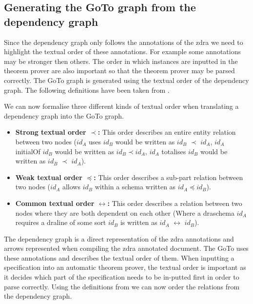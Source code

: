 \subsection{Generating the GoTo graph from the dependency graph}

Since the dependency graph only follows the annotations of the \gls{zdra} we
need to highlight the textual order of these annotations. For example some
annotations may be stronger then others. The order in which instances are
inputted in the theorem prover are also important so that the theorem prover may
be parsed correctly. The GoTo graph is generated using the textual order of the
dependency graph. The following definitions have been taken from
\cite{zengfirstyear}.

\begin{defin} We can now formalise three different kinds of
textual order when translating a dependency graph into the GoTo graph.

\begin{itemize}
\item \textbf{Strong textual order $\prec$:} This order describes an entire
entity relation between two nodes ($id_{A}$ uses $id_{B}$ would be written as
$id_{B}$ $\prec$ $id_{A}$, $id_{A}$ initialOf $id_{B}$ would be written as
$id_{B} \prec id_{A}$, $id_{A}$ totalises $id_{B}$ would be written as $id_{B}$
$\prec$ $id_{A}$).

\item \textbf{Weak textual order $\preceq$:} This order describes a sub-part
relation between two nodes ($id_{A}$ allows $id_{B}$ within a schema written as
$id_{A} \preceq id_{B}$).

\item \textbf{Common textual order $\leftrightarrow$:} This order describes a
relation between two nodes where they are both dependent on each other (Where a
draschema $id_{A}$ requires a draline of some sort $id_{B}$ is written as
$id_{A}$ $\leftrightarrow$ $id_{B}$).
\end{itemize}
\end{defin}

The dependency graph is a direct representation of the \gls{zdra} annotations
and arrows represented when compiling the \gls{zdra} annotated document. The
GoTo uses these annotations and describes the textual order of them. When
inputting a specification into an automatic theorem prover, the textual order is
important as it decides which part of the specification needs to be in-putted
first in order to parse correctly. Using the definitions from
\cite{zengfirstyear} we can now order the relations from the dependency graph.

